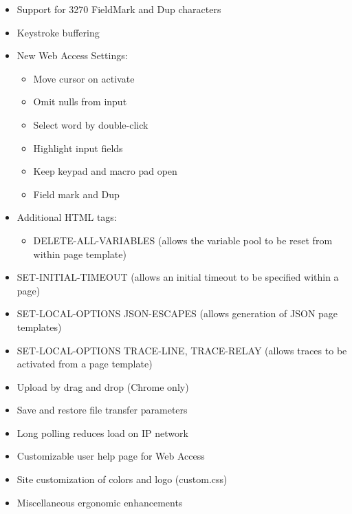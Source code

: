 \documentclass[letterpaper,10pt,english]{sphinxmanual}
\begin{document}
\begin{itemize}
\item {} 
Support for 3270 FieldMark and Dup characters

\item {} 
Keystroke buffering

\item {} 
New Web Access Settings:
\begin{itemize}
\item {} 
Move cursor on activate

\item {} 
Omit nulls from input

\item {} 
Select word by double-click

\item {} 
Highlight input fields

\item {} 
Keep keypad and macro pad open

\item {} 
Field mark and Dup

\end{itemize}

\item {} 
Additional HTML tags:
\begin{itemize}
\item {} 
DELETE-ALL-VARIABLES (allows the variable pool to be reset from within page template)

\end{itemize}

\item {} 
SET-INITIAL-TIMEOUT (allows an initial timeout to be specified within a page)

\item {} 
SET-LOCAL-OPTIONS JSON-ESCAPES (allows generation of JSON page templates)

\item {} 
SET-LOCAL-OPTIONS TRACE-LINE, TRACE-RELAY (allows traces to be activated from a page template)

\item {} 
Upload by drag and drop (Chrome only)

\item {} 
Save and restore file transfer parameters

\item {} 
Long polling reduces load on IP network

\item {} 
Customizable user help page for Web Access

\item {} 
Site customization of colors and logo (custom.css)

\item {} 
Miscellaneous ergonomic enhancements

\end{itemize}
\end{document}
